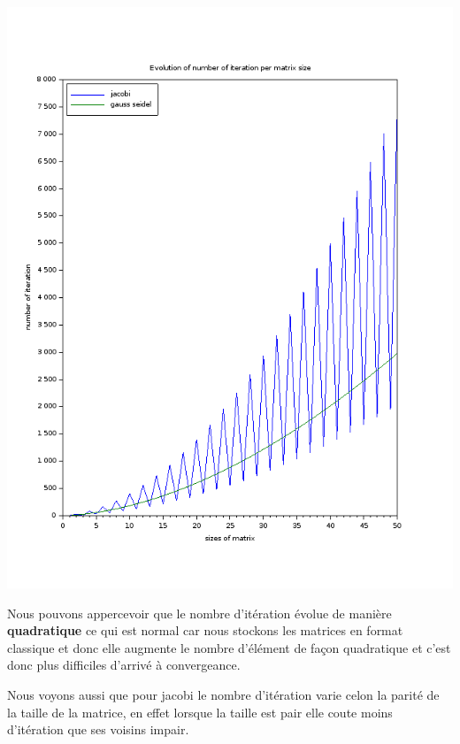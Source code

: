 \documentclass[11pt]{article}
\begin{document}
\includegraphics[scale=0.5]{img/number_of_iteration.png}

Nous pouvons appercevoir que le nombre d'itération évolue de manière
\textbf{quadratique} ce qui est normal car nous stockons les matrices en format
classique et donc elle augmente le nombre d'élément de façon
quadratique et c'est donc plus difficiles d'arrivé à convergeance.\newline

\vspace{5mm}

Nous voyons aussi que pour jacobi le nombre d'itération varie celon la
parité de la taille de la matrice, en effet lorsque la taille est pair
elle coute moins d'itération que ses voisins impair.\newline
\end{document}
